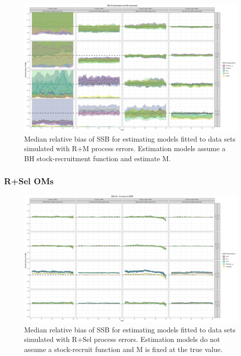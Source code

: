 \documentclass[
  12pt,
]{article}
\begin{document}
\begin{landscape}
\begin{figure}
\caption{Median relative bias of SSB for estimating models fitted to data sets simulated with R+M process errors. Estimation models assume a BH stock-recruitment function and estimate M.}\label{M_om_em_BH_ME_relbias_ssb}
\begin{center}
\includegraphics[width = \textwidth]{M_om_BH_ME_relbias_ssb.png}
\end{center}
\end{figure}
\end{landscape}

\hypertarget{rsel-oms}{%
\subsubsection*{R+Sel OMs}\label{rsel-oms}}

\begin{landscape}
\begin{figure}
\caption{Median relative bias of SSB for estimating models fitted to data sets simulated with R+Sel process errors.  Estimation models do not assume a stock-recruit function and M is fixed at the true value.}\label{Sel_om_em_R_MF_relbias_ssb}
\begin{center}
\includegraphics[width = \textwidth]{Sel_om_R_MF_relbias_ssb.png}
\end{center}
\end{figure}
\end{landscape}
\end{document}
